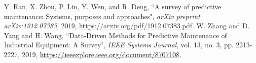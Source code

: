 \documentclass[11pt,a4paper]{article}
\begin{document}
\begin{section}
\begin{thebibliography}{9}
    {Y. Ran, X. Zhou, P. Lin, Y. Wen, and R. Deng},
    “A survey of predictive maintenance: Systems, purposes and approaches",
    \textit{arXiv preprint arXiv:1912.07383},
    2019,
    \href{https://arxiv.org/pdf/1912.07383.pdf}{https://arxiv.org/pdf/1912.07383.pdf}.
    {W. {Zhang} and D. {Yang} and H. {Wang}}, “Data-Driven Methods for Predictive Maintenance of Industrial Equipment: A Survey",
    \textit{IEEE Systems Journal},
    vol. 13, 
    no. 3, 
    pp. 2213-2227,
    2019,
    \href{https://ieeexplore.ieee.org/document/8707108}{https://ieeexplore.ieee.org/document/8707108}.
\end{thebibliography}
\end{section}
\end{document}
